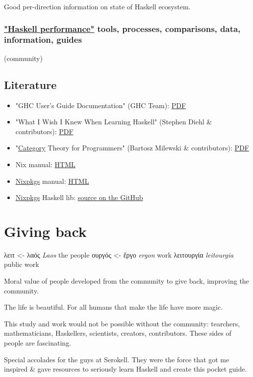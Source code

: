 \documentclass[a4paper,14pt,oneside]{book}
\begin{document}
Good per-direction information on state of Haskell ecosystem.

\section{\href{https://github.com/haskell-perf}{"Haskell performance"} tools, processes, comparisons, data, information, guides}
\label{sec:orge9ad6fe}
(community)

\chapter{Literature}
\label{sec:org849a75f}

\begin{itemize}
\item "GHC User’s Guide Documentation" (GHC Team): \href{https://downloads.haskell.org/\~ghc/latest/docs/users\_guide.pdf}{PDF}
\item "What I Wish I Knew When Learning Haskell" (Stephen Diehl \& contributors): \href{http://dev.stephendiehl.com/hask/tutorial.pdf}{PDF}
\item "\hyperref[org47ffd9b]{Category} Theory for Programmers" (Bartosz Milewski \& contributors): \href{https://s3.amazonaws.com/milewski-ctfp-pdf/category-theory-for-programmers.pdf}{PDF}
\item Nix manual: \href{https://nixos.org/nix/manual/}{HTML}
\item \hyperref[org62a1c83]{Nixpkgs} manual: \href{https://nixos.org/nixpkgs/manual/}{HTML}
\item \hyperref[org62a1c83]{Nixpkgs} Haskell lib: \href{https://github.com/NixOS/nixpkgs/blob/master/pkgs/development/haskell-modules/lib.nix}{source on the GitHub}
\end{itemize}

\part{Giving back}
\label{sec:orgfa22b50}

\textgreek{λειτ}       <- \textgreek{λαός}  \emph{Laos}       the people
    \textgreek{ουργός} <- \textgreek{ἔργο}  \emph{ergon}             work
\textgreek{λειτουργία}          \emph{leitourgia} public work

Moral value of people developed from the community to give back, improving the community.

The life is beautiful.
For all humans that make the life have more magic.

This study and work would not be possible without the community: tearchers, mathematicians, Haskellers, scientists, creators, contributors. These sides of people are fascinating.


Special accolades for the guys at Serokell. They were the force that got me inspired \& gave resources to seriously learn Haskell and create this pocket guide.
\end{document}

